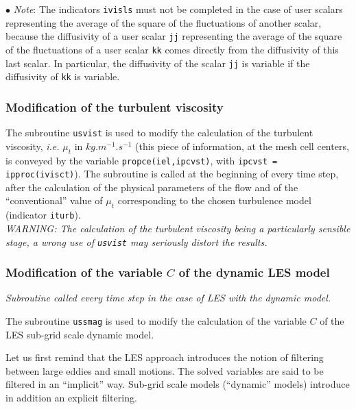 {{{\begin{list}{$\bullet$}{}
{\em Note}: The indicators \texttt{ivisls} must not be completed in the case of
      user scalars representing the average of the square of the
      fluctuations of another scalar, because the diffusivity of a user
      scalar \texttt{jj} representing the average of the square of the
      fluctuations of a user scalar \texttt{kk} comes directly from the
      diffusivity of this last scalar. In particular, the diffusivity
      of the scalar \texttt{jj} is variable if the diffusivity of \texttt{kk}
      is variable.
\end{list}


\subsubsection{Modification of the turbulent viscosity}

The subroutine \texttt{usvist} is used to modify the calculation of the turbulent
viscosity, {\em i.e.} $\mu_t$ in $kg.m^{-1}.s^{-1}$
(this piece of information, at the mesh cell centers, is conveyed by the
variable \texttt{propce(iel,ipcvst)}, with
\texttt{ipcvst =  ipproc(ivisct)}). The
subroutine is called at the beginning of every time step, after the
calculation of the physical parameters of the flow and of the
``conventional'' value of $\mu_t$ corresponding to the chosen turbulence
model (indicator \texttt{iturb}).\\
{\em WARNING: The calculation of the turbulent viscosity being a
particularly sensible stage, a wrong use of {\em\texttt{usvist}} may
seriously distort the results.}

\subsubsection{Modification of the variable $C$ of the dynamic LES model}

\noindent
\textit{Subroutine called every time step in the case of LES with the
dynamic model.}

The subroutine \texttt{ussmag} is used to modify the calculation of the variable $C$ of
the LES sub-grid scale dynamic model.

Let us first remind that the LES approach introduces the notion of
filtering between large eddies and small motions. The solved variables
are said to be filtered in an ``implicit'' way. Sub-grid scale models
(``dynamic'' models) introduce in addition an explicit filtering.

}}}
